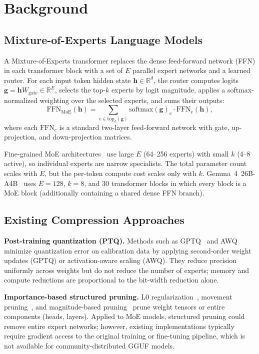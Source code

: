 \documentclass[10pt]{article}
\newcommand{\R}{\mathbb{R}}
\begin{document}
\section{Background}
\label{sec:background}

\subsection{Mixture-of-Experts Language Models}
A Mixture-of-Experts transformer replaces the dense feed-forward network (FFN) in each transformer block with a set of $E$ parallel expert networks and a learned router. For each input token hidden state $\mathbf{h} \in \R^{d}$, the router computes logits $\mathbf{g} = \mathbf{h} W_\text{gate} \in \R^E$, selects the top-$k$ experts by logit magnitude, applies a softmax-normalized weighting over the selected experts, and sums their outputs:
\begin{equation}
  \text{FFN}_\text{MoE}(\mathbf{h}) = \sum_{e \in \text{top}_k(\mathbf{g})} \text{softmax}(\mathbf{g})_e \cdot \text{FFN}_e(\mathbf{h}),
  \label{eq:moe}
\end{equation}
where each $\text{FFN}_e$ is a standard two-layer feed-forward network with gate, up-projection, and down-projection matrices.

Fine-grained MoE architectures~\cite{dai2024deepseekmoe} use large $E$ (64--256 experts) with small $k$ (4--8 active), so individual experts are narrow specialists. The total parameter count scales with $E$, but the per-token compute cost scales only with $k$. Gemma~4~26B-A4B~\cite{team2025gemma} uses $E = 128$, $k = 8$, and 30 transformer blocks in which every block is a MoE block (additionally containing a shared dense FFN branch).

\subsection{Existing Compression Approaches}
\textbf{Post-training quantization (PTQ).} Methods such as GPTQ~\cite{frantar2022gptq} and AWQ~\cite{lin2024awq} minimize quantization error on calibration data by applying second-order weight updates (GPTQ) or activation-aware scaling (AWQ). They reduce precision uniformly across weights but do not reduce the number of experts; memory and compute reductions are proportional to the bit-width reduction alone.

\textbf{Importance-based structured pruning.} L0 regularization~\cite{louizos2018learning}, movement pruning~\cite{sanh2020movement}, and magnitude-based pruning~\cite{han2015learning} prune weight tensors or entire components (heads, layers). Applied to MoE models, structured pruning could remove entire expert networks; however, existing implementations typically require gradient access to the original training or fine-tuning pipeline, which is not available for community-distributed GGUF models.
\end{document}
